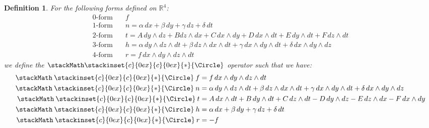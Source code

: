 \documentclass[15pt]{book}
\theoremstyle{break}
\theoremstyle{break}
\newtheorem{defn}{Definition}[corL]
\newcommand{\R}{\mathbb{R}}
\newcommand\oast{\stackMath\mathbin{\stackinset{c}{0ex}{c}{0ex}{\ast}{\Circle}}}
\begin{document}
\begin{defn}
For the following forms defined on $\R^4$:
\begin{align*}
0\text{-form} &\quad f\\ 
1\text{-form} &\quad n = \alpha\, dx+\beta\, dy+\gamma\, dz+ \delta\, dt\\
2\text{-form} &\quad t = A\, dy\wedge dz+Bdz\wedge dx+C\, dx\wedge dy+D\, dx\wedge dt +E\, dy \wedge dt+F\, dz\wedge dt\\ 
3\text{-form} &\quad h =\alpha \, dy\wedge dz\wedge dt+\beta \,dz\wedge dx\wedge dt + \gamma\, dx\wedge dy \wedge dt+ \delta \, dx\wedge dy \wedge dz \\
4\text{-form} &\quad r = f\, dx\wedge dy\wedge dz\wedge dt
\end{align*}
we define the $\oast$ operator such that we have:
\begin{align*}
\oast f &= f\, dx\wedge dy\wedge dz\wedge dt\\
\oast n &= \alpha \, dy \wedge dz \wedge dt + \beta\, dz\wedge dx \wedge dt + \gamma\, dx \wedge dy \wedge dt + \delta \, dx\wedge dy \wedge dz\\
\oast t &= A\, dx\wedge dt + B\, dy \wedge dt + C \, dz\wedge dt - D\, dy \wedge dz - E\, dz \wedge dx -  F\, dx \wedge dy\\
\oast h &= \alpha\, dx + \beta \, dy + \gamma\, dz + \delta \, dt \\
\oast r &=  -f
\end{align*}
\end{defn}
\end{document}
